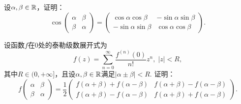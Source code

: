 \begin{mybox}
  \begin{problem}[循环矩阵的函数.]
    \begin{enum}
      \item 设$\alpha,\beta\in\mathbb R$，证明：
      \[
        \cos \begin{pmatrix}
          \alpha & \beta \\
          \beta & \alpha
        \end{pmatrix} = \begin{pmatrix}
          \cos\alpha\cos\beta & -\sin\alpha\sin\beta \\
          -\sin\alpha \sin\beta & \cos\alpha\cos\beta
        \end{pmatrix}.
      \]
      \item 设函数$f$在0处的泰勒级数展开式为
    \[
      f(z) = \sum_{n=0}^\infty \frac{f^{(n)}(0)}{n!}z^n,\; |z|<R,
    \]
    其中$R\in(0,+\infty]$，且设$\alpha,\beta\in\mathbb R$满足$|\alpha\pm\beta|<R$. 证明：
    \[
      f\begin{pmatrix}
        \alpha & \beta \\
        \beta & \alpha
      \end{pmatrix} = \frac12 \begin{pmatrix}
        f(\alpha+\beta) + f(\alpha-\beta) & f(\alpha+\beta) - f(\alpha-\beta) \\
        f(\alpha+\beta) - f(\alpha-\beta) & f(\alpha+\beta) + f(\alpha-\beta)
      \end{pmatrix}.
    \]
    \end{enum}
  \end{problem}
\end{mybox}

